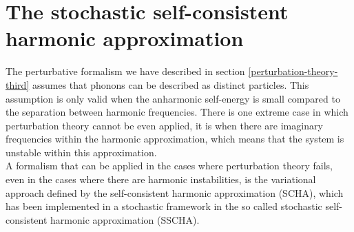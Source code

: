 \section{The stochastic self-consistent harmonic approximation}
\label{sscha-basics}

The perturbative formalism we have described in section \ref{perturbation-theory-third} assumes that phonons can be described as distinct particles. This assumption is only valid when the anharmonic self-energy is 
small compared to the separation between harmonic frequencies. There is one extreme case in which perturbation theory cannot be even applied, it is when there are imaginary frequencies within the harmonic approximation, which 
means that the system is unstable within this approximation. \\

A formalism that can be applied in the cases where perturbation theory fails, even in the cases where there are harmonic instabilities, is the variational approach defined by the self-consistent harmonic 
approximation (SCHA)\cite{hooton1955li}, which has been implemented in a stochastic framework in the so called stochastic self-consistent harmonic approximation (SSCHA)\cite{errea2014anharmonic,errea2013first}. \\ 

